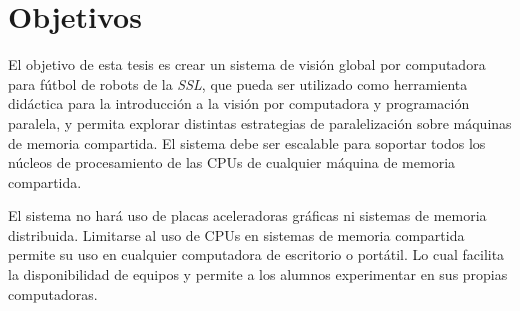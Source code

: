 
\section{Objetivos}

\label{objetivos}

El objetivo de esta tesis es crear un sistema de visión global por computadora
para fútbol de robots de la \emph{SSL}, que pueda ser utilizado como herramienta
didáctica para la introducción a la visión por computadora y programación
paralela, y permita explorar distintas estrategias de paralelización sobre
máquinas de memoria compartida. El sistema debe ser escalable para soportar
todos los núcleos de procesamiento de las CPUs de cualquier máquina de memoria
compartida.

El sistema no hará uso de placas aceleradoras gráficas ni sistemas de memoria
distribuida. Limitarse al uso de CPUs en sistemas de memoria compartida permite
su uso en cualquier computadora de escritorio o portátil. Lo cual facilita la
disponibilidad de equipos y permite a los alumnos experimentar en sus propias
computadoras.
